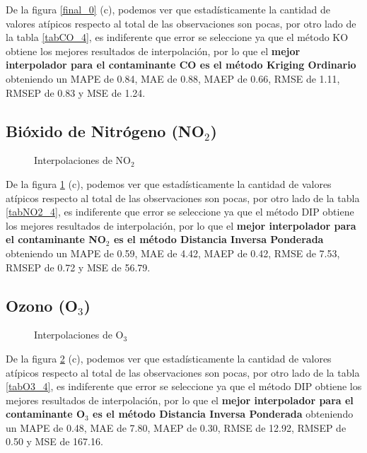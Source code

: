 De la figura \ref{final_0} (c), podemos ver que estadísticamente la cantidad de valores atípicos respecto al total de las observaciones son pocas, por otro lado de la tabla \ref{tabCO_4}, es indiferente que error se seleccione ya que el método KO obtiene los mejores resultados de interpolación, por lo que el \textbf{mejor interpolador para el contaminante CO es el método Kriging Ordinario} obteniendo un MAPE de 0.84, MAE de 0.88, MAEP de 0.66, RMSE de 1.11, RMSEP de 0.83 y MSE de 1.24.

\subsection{Bióxido de Nitrógeno (NO$_{2}$)}
\begin{figure}[h]
\centering
{}
\caption{Interpolaciones de NO$_{2}$}
\label{final_2}
\end{figure}

De la figura \ref{final_2} (c), podemos ver que estadísticamente la cantidad de valores atípicos respecto al total de las observaciones son pocas, por otro lado de la tabla \ref{tabNO2_4}, es indiferente que error se seleccione ya que el método DIP obtiene los mejores resultados de interpolación, por lo que el \textbf{mejor interpolador para el contaminante NO$_{2}$ es el método Distancia Inversa Ponderada} obteniendo un MAPE de 0.59, MAE de 4.42, MAEP de 0.42, RMSE de 7.53, RMSEP de 0.72 y MSE de 56.79.

\subsection{Ozono (O$_{3}$)}
\begin{figure}[h]
\centering
{}
\caption{Interpolaciones de O$_{3}$}
\label{final_4}
\end{figure}

De la figura \ref{final_4} (c), podemos ver que estadísticamente la cantidad de valores atípicos respecto al total de las observaciones son pocas, por otro lado de la tabla \ref{tabO3_4}, es indiferente que error se seleccione ya que el método DIP obtiene los mejores resultados de interpolación, por lo que el \textbf{mejor interpolador para el contaminante O$_{3}$ es el método Distancia Inversa Ponderada} obteniendo un MAPE de 0.48, MAE de 7.80, MAEP de 0.30, RMSE de 12.92, RMSEP de 0.50 y MSE de 167.16.

